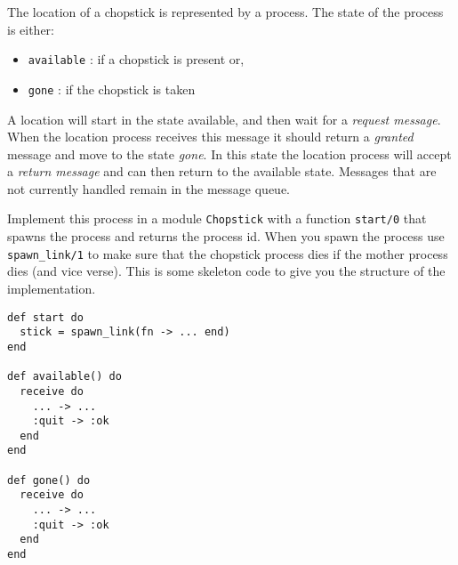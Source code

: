 \documentclass[a4paper,11pt]{article}
\begin{document}
The location of a chopstick is represented by a process. The state of
the process is either:

\begin{itemize}
\item {\tt available} : if a chopstick is present or,
\item {\tt gone} : if the chopstick is taken
\end{itemize}

A location will start in the state available, and then wait for a {\em request message}. When the location process receives this message it
should return a {\em granted} message and move to the state {\em gone}.
In this state the location process will accept a {\em return message} 
and can then return to the available state. Messages that are not currently handled remain in the message queue.

\begin{figure}[h!]
    \centering
\end{figure}

Implement this process in a module {\tt Chopstick} with a
function {\tt start/0} that spawns the process and returns the process
id. When you spawn the process use {\tt spawn\_link/1} to make sure
that the chopstick process dies if the mother process dies (and vice
verse). This is some skeleton code to give you the structure of the
implementation.

\begin{verbatim}
def start do
  stick = spawn_link(fn -> ... end)
end

def available() do
  receive do
    ... -> ...
    :quit -> :ok
  end
end

def gone() do
  receive do
    ... -> ...
    :quit -> :ok
  end
end
\end{verbatim}
\end{document}
